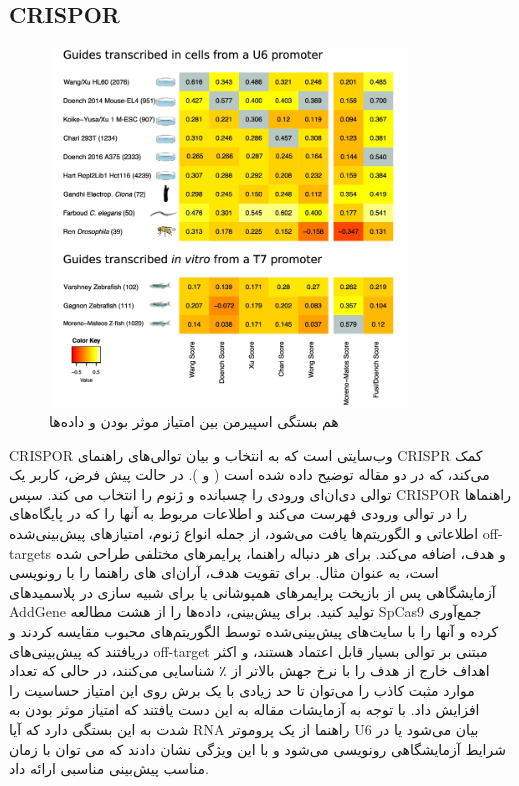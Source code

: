 \documentclass[12pt,a4paper,BCOR=.7cm,headsepline,bibliography=totoc]{report}
\begin{document}
\subsection{CRISPOR~\cite{CRISPOR}}
\begin{figure}
\centering
\includegraphics[width=9.5cm, ]{pictures/CRISPOR.jpg}
\caption{
هم بستگی اسپیرمن بین امتیاز موثر بودن و داده‌ها	\cite{CRISPOR}
}\label{wrap-fig:4}
\end{figure}
CRISPOR
 وب‌سایتی است که به انتخاب و بیان توالی‌های راهنمای CRISPR کمک می‌کند، که در دو مقاله توضیح داده شده است (  و  ). در حالت پیش فرض، کاربر یک توالی دی‌ان‌ای ورودی را چسبانده و ژنوم را انتخاب می کند. سپس CRISPOR راهنماها را در توالی ورودی فهرست می‌کند و اطلاعات مربوط به آنها را که در پایگاه‌های اطلاعاتی و الگوریتم‌ها یافت می‌شود، از جمله انواع ژنوم، امتیازهای پیش‌بینی‌شده off-targets و هدف، اضافه می‌کند. برای هر دنباله راهنما، پرایمرهای مختلفی طراحی شده است، به عنوان مثال. برای تقویت هدف، آر‌ان‌ای های راهنما را با رونویسی آزمایشگاهی پس از بازپخت پرایمرهای همپوشانی یا برای شبیه سازی در پلاسمیدهای AddGene تولید کنید.
برای پیش‌بینی، داده‌ها را از هشت مطالعه  SpCas9 جمع‌آوری کرده و آنها را با سایت‌های پیش‌بینی‌شده توسط الگوریتم‌های محبوب مقایسه کردند و دریافتند که پیش‌بینی‌های off-target مبتنی بر توالی بسیار قابل اعتماد هستند، و اکثر اهداف خارج از هدف را با نرخ جهش بالاتر از ٪ شناسایی می‌کنند، در حالی که تعداد موارد مثبت کاذب را می‌توان تا حد زیادی با یک برش روی این امتیاز حساسیت را افزایش داد. با توجه به آزمایشات مقاله به این دست یافتند که امتیاز موثر بودن به شدت به این بستگی دارد که آیا RNA راهنما از یک پروموتر U6 بیان می‌شود یا در شرایط آزمایشگاهی رونویسی می‌شود و با این ویژگی نشان دادند که می توان با زمان مناسب پیش‌بینی مناسبی ارائه داد.
\end{document}
